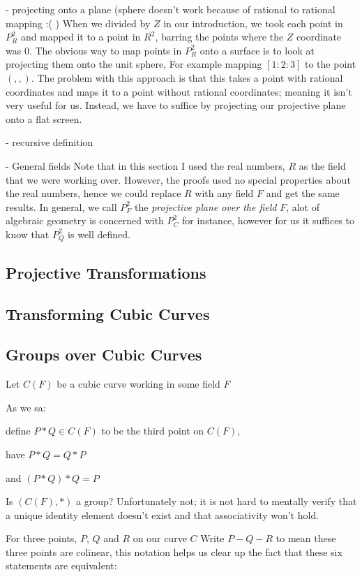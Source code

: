 \documentclass{article}
\begin{document}
- projecting onto a plane (sphere doesn't work because of rational to rational mapping :( )
When we divided by $Z$ in our introduction, we took each point in $P_R^2$ and mapped it to a point in $R^2$, barring the points where the $Z$ coordinate was $0$. The obvious way to map points in $P_R^2$ onto a surface is to look at projecting them onto the unit sphere, For example mapping $[1 : 2 : 3]$ to the point $(,,)$. The problem with this approach is that this takes a point with rational coordinates and maps it to a point without rational coordinates; meaning it isn't very useful for us. Instead, we have to suffice by projecting our projective plane onto a flat screen.

- recursive definition

- General fields
 Note that in this section I used the real numbers, $R$ as the field that we were working over. However, the proofs used no special properties about the real numbers, hence we could replace $R$ with any field $F$ and get the same results. In general, we call $P_F^2$ the \emph{projective plane over the field} $F$,  alot of algebraic geometry is concerned with $P_C^2$ for instance, however for us it suffices to know that $P_Q^2$ is well defined.

\subsection{Projective Transformations}

\subsection{Transforming Cubic Curves}

\subsection{Groups over Cubic Curves}

Let $C(F)$ be a cubic curve working in some field $F$

As we sa:

define $P * Q \in C(F)$ to be the third point on $C(F)$,

have $P * Q = Q * P$

and $(P * Q) * Q = P$

Is $(C(F), *)$ a group? Unfortunately not; it is not hard to mentally verify that a unique identity element doesn't exist and that associativity won't hold.

For three points, $P$, $Q$ and $R$ on our curve $C$ Write $P - Q - R$ to mean these three points are colinear, this notation helps us clear up the fact that these six statements are equivalent:
\end{document}
